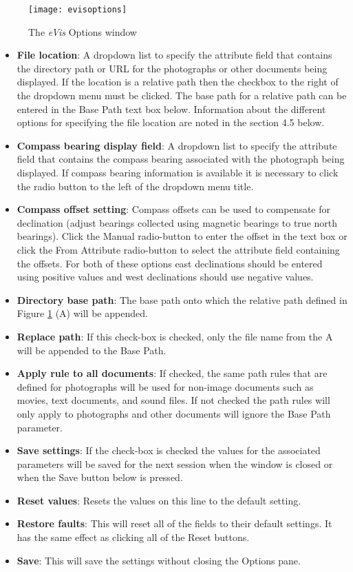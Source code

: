 \label{evis_options_window}

\begin{figure}[ht]
   \begin{center}
\caption{\label{evisoptions}The \emph{eVis} Options window \nixcaption}
\texttt{[image: evisoptions]}
\end{center}
\end{figure}

\begin{itemize}
\item \textbf{File location}: A dropdown list to specify the attribute field that contains the
directory path or URL for the photographs or other documents being displayed. If the location is a
relative path then the checkbox to the right of the dropdown menu must be clicked. The base path for
a relative path can be entered in the Base Path text box below. Information about the different
options for specifying the file location are noted in the section 4.5 below.
\item \textbf{Compass bearing display field}: A dropdown list to specify the attribute field
that contains the compass bearing associated with the photograph being displayed. If compass bearing
information is available it is necessary to click the radio button to the left of the dropdown menu
title.
\item \textbf{Compass offset setting}: Compass offsets can be used to compensate for
declination (adjust bearings collected using magnetic bearings to true north bearings). Click the
Manual radio-button to enter the offset in the text box or click the From Attribute  radio-button to
select the attribute field containing the offsets. For both of these options east declinations
should be entered using positive values and west declinations should use negative values.
\item \textbf{Directory base path}: The base path onto which the relative path defined in
Figure \ref{evisoptions} (A) will be appended.
\item \textbf{Replace path}: If this check-box is checked, only the file name from the A
will be appended to the Base Path.
\item \textbf{Apply rule to all documents}: If checked, the same path rules that are defined
for photographs will be used for non-image documents such as movies, text documents, and sound
files. If not checked the path rules will only apply to photographs and other documents will ignore
the Base Path  parameter.
\item \textbf{Save settings}: If the check-box is checked the values for the associated
parameters will be saved for the next session when the window is closed or when the Save button
below is pressed.
\item \textbf{Reset values}: Resets the values on this line to the default setting.
\item \textbf{Restore faults}: This will reset all of the fields to their default settings.
It has the same effect as clicking all of the Reset buttons.
\item \textbf{Save}: This will save the settings without closing the Options pane.
\end{itemize}

